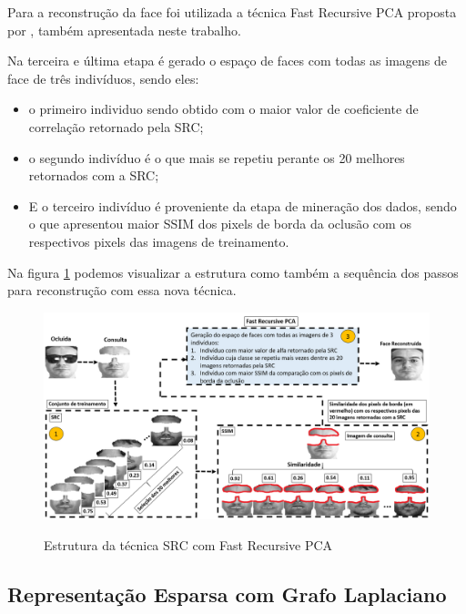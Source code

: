 Para a reconstrução da face foi utilizada a técnica Fast Recursive PCA proposta por , também apresentada neste trabalho.

Na terceira e última etapa é gerado o espaço de faces com todas as imagens de face de três indivíduos, sendo eles:

\begin{itemize}

 \item o primeiro individuo sendo obtido com o maior valor de coeficiente de correlação retornado pela SRC; 
 \item o segundo indivíduo é o que mais se repetiu perante os 20 melhores retornados com a SRC; 
 \item E o terceiro indivíduo é proveniente da etapa de mineração dos dados, sendo o que apresentou maior SSIM dos pixels de borda da oclusão com os respectivos pixels das imagens de treinamento.

\end{itemize}

Na figura \ref{fig:estrutura_src_fast_rec_pca}  podemos visualizar a estrutura como também a sequência dos passos para reconstrução com essa nova técnica.

\begin{figure}[H]
\centering
\caption{Estrutura da técnica SRC com Fast Recursive PCA}
\includegraphics[scale = 0.40]{imgs4/estrutura/estrutura_src_fast_rec_pca}
\label{fig:estrutura_src_fast_rec_pca}
\end{figure}



\subsection{Representação Esparsa com Grafo Laplaciano}
\label{sub:SRC_GL}

